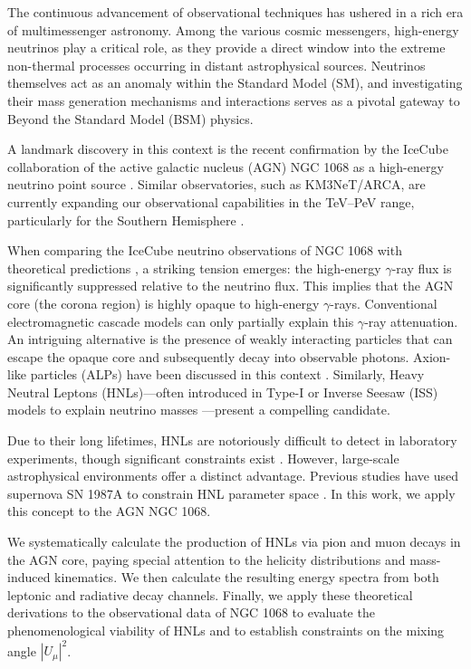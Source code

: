 \documentclass{article}
\begin{document}
The continuous advancement of observational techniques has ushered in a rich era of multimessenger astronomy. Among the various cosmic messengers, high-energy neutrinos play a critical role, as they provide a direct window into the extreme non-thermal processes occurring in distant astrophysical sources. Neutrinos themselves act as an anomaly within the Standard Model (SM), and investigating their mass generation mechanisms and interactions serves as a pivotal gateway to Beyond the Standard Model (BSM) physics.

A landmark discovery in this context is the recent confirmation by the IceCube collaboration of the active galactic nucleus (AGN) NGC 1068 as a high-energy neutrino point source \cite{icecube2022evidence}. Similar observatories, such as KM3NeT/ARCA, are currently expanding our observational capabilities in the TeV--PeV range, particularly for the Southern Hemisphere \cite{km3net2024astronomy, km3net2025observation}.

When comparing the IceCube neutrino observations of NGC 1068 with theoretical predictions \cite[e.g.,][]{murase2020hidden}, a striking tension emerges: the high-energy $\gamma$-ray flux is significantly suppressed relative to the neutrino flux. This implies that the AGN core (the corona region) is highly opaque to high-energy $\gamma$-rays. Conventional electromagnetic cascade models can only partially explain this $\gamma$-ray attenuation. An intriguing alternative is the presence of weakly interacting particles that can escape the opaque core and subsequently decay into observable photons. Axion-like particles (ALPs) have been discussed in this context \cite{pant2024constraining}. Similarly, Heavy Neutral Leptons (HNLs)—often introduced in Type-I or Inverse Seesaw (ISS) models to explain neutrino masses \cite{king2025righthandedneutrinosseesawmodels}—present a compelling candidate. 

Due to their long lifetimes, HNLs are notoriously difficult to detect in laboratory experiments, though significant constraints exist \cite{bryman2019constraints}. However, large-scale astrophysical environments offer a distinct advantage. Previous studies have used supernova SN 1987A to constrain HNL parameter space \cite{Magill_2018}. In this work, we apply this concept to the AGN NGC 1068.

We systematically calculate the production of HNLs via pion and muon decays in the AGN core, paying special attention to the helicity distributions and mass-induced kinematics. We then calculate the resulting energy spectra from both leptonic and radiative decay channels. Finally, we apply these theoretical derivations to the observational data of NGC 1068 to evaluate the phenomenological viability of HNLs and to establish constraints on the mixing angle $|U_\mu|^2$.
\end{document}
